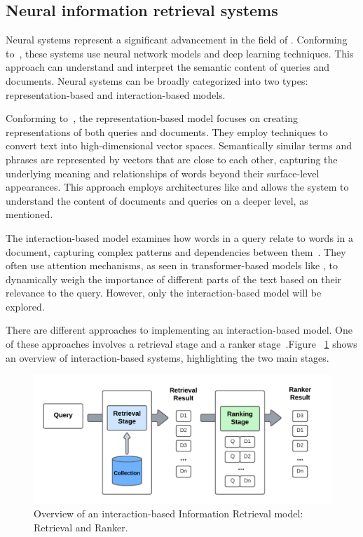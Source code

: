 \subsection{Neural information retrieval systems}

Neural {\ir} systems represent a significant advancement in the field of {\ir}. Conforming to~\citet{mitra_introduction_nodate}, these systems use neural network models and deep learning techniques. This approach can understand and interpret the semantic content of queries and documents. Neural {\ir} systems can be broadly categorized into two types: representation-based and interaction-based models.

Conforming to~\citet{chen_integrating_2023}, the representation-based model focuses on creating representations of both queries and documents. They employ techniques to convert text into high-dimensional vector spaces. Semantically similar terms and phrases are represented by vectors that are close to each other, capturing the underlying meaning and relationships of words beyond their surface-level appearances. This approach employs architectures like {\rnn} and allows the system to understand the content of documents and queries on a deeper level, as~\citet{liu_deep_2022} mentioned.

The interaction-based model examines how words in a query relate to words in a document, capturing complex patterns and dependencies between them~\cite{chen_integrating_2023}. They often use attention mechanisms, as seen in transformer-based models like {\bert}, to dynamically weigh the importance of different parts of the text based on their relevance to the query. However, only the interaction-based model will be explored.

There are different approaches to implementing an interaction-based model. One of these approaches involves a retrieval stage and a ranker stage~\cite{mitra_introduction_nodate}.Figure ~\ref{fig_ir_system} shows an overview of interaction-based {\ir} systems, highlighting the two main stages.

\begin{figure}[ht]
    \includegraphics[width=\textwidth]{figs/chapter2/IR_system.png}
    \centering
    \caption[Overview of an interaction-based Information Retrieval model]{Overview of an interaction-based Information Retrieval model: Retrieval and Ranker.}
    \label{fig_ir_system}
\end{figure}

